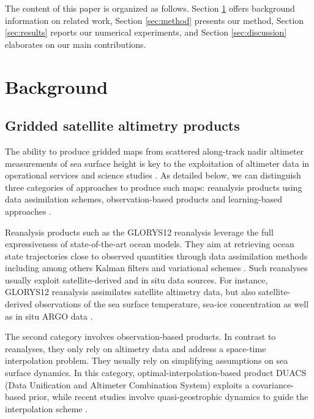 \begin{bibunit}
    
The content of this paper is organized as follows. Section \ref{sec:background} offers background information on related work, Section \ref{sec:method} presents our method, Section \ref{sec:results} reports our numerical experiments, and Section \ref{sec:discussion} elaborates on our main contributions.




\section{Background}
\label{sec:background}
\subsection{Gridded satellite altimetry products}
\label{ssec:interpolation}
The ability to produce gridded maps from scattered along-track nadir altimeter measurements of sea surface height is key to the exploitation of altimeter data in operational services and science studies \cite{abdallaAltimetryFutureBuilding2021}.
As detailed below, we can distinguish three categories of approaches to produce such maps: reanalysis products \cite{jean-michelCopernicusGlobal122021} using data assimilation schemes, observation-based products \cite{taburetDUACSDT2018252019} and learning-based approaches \cite{fabletENDTOENDPHYSICSINFORMEDREPRESENTATION2021}.

Reanalysis products such as the GLORYS12 reanalysis \cite{jean-michelCopernicusGlobal122021} leverage the full expressiveness of state-of-the-art ocean models. They aim at retrieving ocean state trajectories close to observed quantities through data assimilation methods including among others Kalman filters and variational schemes \cite{carrassiDataAssimilationGeosciences2018}. Such reanalyses usually exploit satellite-derived and in situ data sources. For instance, GLORYS12 reanalysis assimilates satellite altimetry data, but also satellite-derived observations of the sea surface temperature, sea-ice concentration as well as in situ ARGO data  \cite{wongArgoData19992020}.


The second category involves observation-based products. In contrast to reanalyses, they only rely on altimetry data and address a space-time interpolation problem. They usually rely on simplifying assumptions on sea surface dynamics. In this category, optimal-interpolation-based product DUACS (Data Unification and Altimeter Combination System) \cite{taburetDUACSDT2018252019} exploits a covariance-based prior, while recent studies involve quasi-geostrophic dynamics to guide the interpolation scheme \cite{guillouMappingAltimetryForthcoming2021,ballarottaDynamicMappingAlongTrack2020}.


\end{bibunit}
